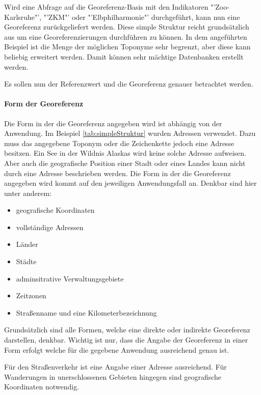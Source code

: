 			Wird eine Abfrage auf die Georeferenz-Basis mit den Indikatoren "'Zoo-Karlsruhe"', "'ZKM"' oder "'Elbphilharmonie"' durchgeführt, kann nun eine Georeferenz zurückgeliefert werden.
			Diese simple Struktur reicht grundsätzlich aus um eine Georeferenzierungen durchführen zu können.
			In dem angeführten Beispiel ist die Menge der möglichen Toponyme sehr begrenzt, aber diese kann beliebig erweitert werden.
			Damit können sehr mächtige Datenbanken erstellt werden.

			Es sollen nun der Referenzwert und die Georeferenz genauer betrachtet werden.

			\paragraph{Form der Georeferenz}

				Die Form in der die Georeferenz angegeben wird ist abhängig von der Anwendung. 
				Im Beispiel \ref{tab:simpleStruktur} wurden Adressen verwendet. 
				Dazu muss das angegebene Toponym oder die Zeichenkette jedoch eine Adresse besitzen. 
				Ein See in der Wildnis Alaskas wird keine solche Adresse aufweisen.
				Aber auch die geografische Position einer Stadt oder eines Landes kann nicht durch eine Adresse beschrieben werden. 
				Die Form in der die Georeferenz angegeben wird kommt auf den jeweiligen Anwendungsfall an.
				Denkbar sind hier unter anderem:

				\begin{itemize}
				  	 \item geografische Koordinaten
				  	 \item vollständige Adressen
				  	 \item Länder
				  	 \item Städte
				  	 \item adminsitrative Verwaltungsgebiete 
				  	 \item Zeitzonen
				  	 \item Straßenname und eine Kilometerbezeichnung
				  \end{itemize}  

				  Grundsätzlich sind alle Formen, welche eine direkte oder indirekte Georeferenz darstellen, denkbar.
				  Wichtig ist nur, dass die Angabe der Georeferenz in einer Form erfolgt welche für die gegebene Anwendung ausreichend genau ist.

				  Für den Straßenverkehr ist eine Angabe einer Adresse ausreichend.
				  Für Wanderungen in unerschlossenen Gebieten hingegen sind geografische Koordinaten notwendig. 

